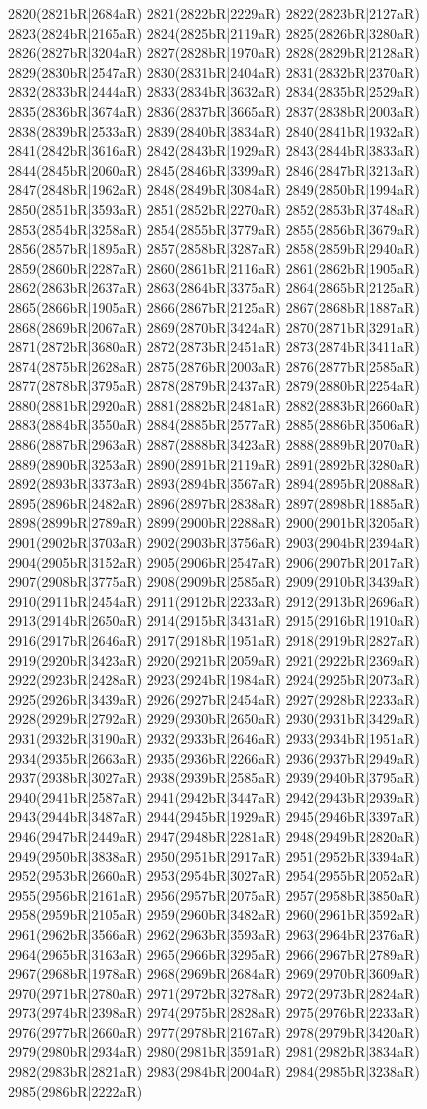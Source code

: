 2820(2821bR|2684aR) 2821(2822bR|2229aR) 2822(2823bR|2127aR) 2823(2824bR|2165aR) 2824(2825bR|2119aR) 2825(2826bR|3280aR) 2826(2827bR|3204aR) 2827(2828bR|1970aR) 2828(2829bR|2128aR) 2829(2830bR|2547aR) 2830(2831bR|2404aR) 2831(2832bR|2370aR) 2832(2833bR|2444aR) 2833(2834bR|3632aR) 2834(2835bR|2529aR) 2835(2836bR|3674aR) 2836(2837bR|3665aR) 2837(2838bR|2003aR) 2838(2839bR|2533aR) 2839(2840bR|3834aR) 2840(2841bR|1932aR) 2841(2842bR|3616aR) 2842(2843bR|1929aR) 2843(2844bR|3833aR) 2844(2845bR|2060aR) 2845(2846bR|3399aR) 2846(2847bR|3213aR) 2847(2848bR|1962aR) 2848(2849bR|3084aR) 2849(2850bR|1994aR) 2850(2851bR|3593aR) 2851(2852bR|2270aR) 2852(2853bR|3748aR) 2853(2854bR|3258aR) 2854(2855bR|3779aR) 2855(2856bR|3679aR) 2856(2857bR|1895aR) 2857(2858bR|3287aR) 2858(2859bR|2940aR) 2859(2860bR|2287aR) 2860(2861bR|2116aR) 2861(2862bR|1905aR) 2862(2863bR|2637aR) 2863(2864bR|3375aR) 2864(2865bR|2125aR) 2865(2866bR|1905aR) 2866(2867bR|2125aR) 2867(2868bR|1887aR) 2868(2869bR|2067aR) 2869(2870bR|3424aR) 2870(2871bR|3291aR) 2871(2872bR|3680aR) 2872(2873bR|2451aR) 2873(2874bR|3411aR) 2874(2875bR|2628aR) 2875(2876bR|2003aR) 2876(2877bR|2585aR) 2877(2878bR|3795aR) 2878(2879bR|2437aR) 2879(2880bR|2254aR) 2880(2881bR|2920aR) 2881(2882bR|2481aR) 2882(2883bR|2660aR) 2883(2884bR|3550aR) 2884(2885bR|2577aR) 2885(2886bR|3506aR) 2886(2887bR|2963aR) 2887(2888bR|3423aR) 2888(2889bR|2070aR) 2889(2890bR|3253aR) 2890(2891bR|2119aR) 2891(2892bR|3280aR) 2892(2893bR|3373aR) 2893(2894bR|3567aR) 2894(2895bR|2088aR) 2895(2896bR|2482aR) 2896(2897bR|2838aR) 2897(2898bR|1885aR) 2898(2899bR|2789aR) 2899(2900bR|2288aR) 2900(2901bR|3205aR) 2901(2902bR|3703aR) 2902(2903bR|3756aR) 2903(2904bR|2394aR) 2904(2905bR|3152aR) 2905(2906bR|2547aR) 2906(2907bR|2017aR) 2907(2908bR|3775aR) 2908(2909bR|2585aR) 2909(2910bR|3439aR) 2910(2911bR|2454aR) 2911(2912bR|2233aR) 2912(2913bR|2696aR) 2913(2914bR|2650aR) 2914(2915bR|3431aR) 2915(2916bR|1910aR) 2916(2917bR|2646aR) 2917(2918bR|1951aR) 2918(2919bR|2827aR) 2919(2920bR|3423aR) 2920(2921bR|2059aR) 2921(2922bR|2369aR) 2922(2923bR|2428aR) 2923(2924bR|1984aR) 2924(2925bR|2073aR) 2925(2926bR|3439aR) 2926(2927bR|2454aR) 2927(2928bR|2233aR) 2928(2929bR|2792aR) 2929(2930bR|2650aR) 2930(2931bR|3429aR) 2931(2932bR|3190aR) 2932(2933bR|2646aR) 2933(2934bR|1951aR) 2934(2935bR|2663aR) 2935(2936bR|2266aR) 2936(2937bR|2949aR) 2937(2938bR|3027aR) 2938(2939bR|2585aR) 2939(2940bR|3795aR) 2940(2941bR|2587aR) 2941(2942bR|3447aR) 2942(2943bR|2939aR) 2943(2944bR|3487aR) 2944(2945bR|1929aR) 2945(2946bR|3397aR) 2946(2947bR|2449aR) 2947(2948bR|2281aR) 2948(2949bR|2820aR) 2949(2950bR|3838aR) 2950(2951bR|2917aR) 2951(2952bR|3394aR) 2952(2953bR|2660aR) 2953(2954bR|3027aR) 2954(2955bR|2052aR) 2955(2956bR|2161aR) 2956(2957bR|2075aR) 2957(2958bR|3850aR) 2958(2959bR|2105aR) 2959(2960bR|3482aR) 2960(2961bR|3592aR) 2961(2962bR|3566aR) 2962(2963bR|3593aR) 2963(2964bR|2376aR) 2964(2965bR|3163aR) 2965(2966bR|3295aR) 2966(2967bR|2789aR) 2967(2968bR|1978aR) 2968(2969bR|2684aR) 2969(2970bR|3609aR) 2970(2971bR|2780aR) 2971(2972bR|3278aR) 2972(2973bR|2824aR) 2973(2974bR|2398aR) 2974(2975bR|2828aR) 2975(2976bR|2233aR) 2976(2977bR|2660aR) 2977(2978bR|2167aR) 2978(2979bR|3420aR) 2979(2980bR|2934aR) 2980(2981bR|3591aR) 2981(2982bR|3834aR) 2982(2983bR|2821aR) 2983(2984bR|2004aR) 2984(2985bR|3238aR) 2985(2986bR|2222aR) 